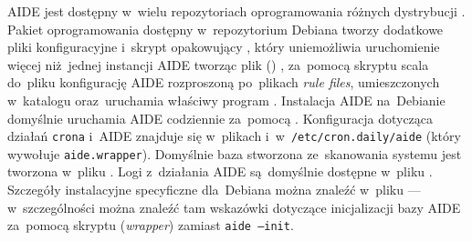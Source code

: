 \documentclass[thesis]{subfiles}
\begin{document}
AIDE jest dostępny w~wielu repozytoriach oprogramowania różnych dystrybucji . Pakiet oprogramowania dostępny w~repozytorium Debiana tworzy dodatkowe pliki konfiguracyjne i~skrypt opakowujący , który uniemożliwia uruchomienie więcej niż~jednej instancji AIDE tworząc plik () , za~pomocą skryptu  scala do~pliku  konfigurację AIDE rozproszoną po~plikach \emph{rule files}, umieszczonych w~katalogu  oraz~uruchamia właściwy program . Instalacja AIDE na~Debianie domyślnie uruchamia AIDE codziennie za~pomocą . Konfiguracja dotycząca działań \texttt{crona} i~AIDE znajduje się w~plikach  i~w~\texttt{/etc/cron.daily/aide} (który wywołuje \texttt{aide.wrapper}). Domyślnie baza stworzona ze~skanowania systemu jest tworzona w~pliku . Logi z~działania AIDE są~domyślnie dostępne w~pliku . Szczegóły instalacyjne specyficzne dla~Debiana można znaleźć w~pliku  --- w~szczególności można znaleźć tam wskazówki dotyczące inicjalizacji bazy AIDE za~pomocą skryptu  (\emph{wrapper}) zamiast \texttt{aide~--init}.

%
%

%
%
\end{document}
